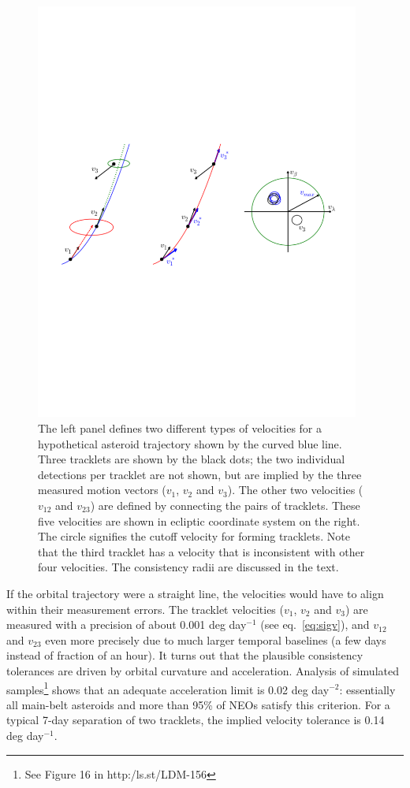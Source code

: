 \begin{figure}[th!]
\centering
\vskip -2.6in
\includegraphics[width=0.95\textwidth]{figures/TrackSlide1}
\vskip -2.7in
\caption{The left panel defines two different types of velocities for a hypothetical asteroid
trajectory shown by the curved blue line. Three tracklets are shown by the black dots; the 
two individual detections per tracklet are not shown, but are implied by the three measured
motion vectors ($v_1$, $v_2$ and $v_3$). The other two velocities ($v_{12}$ and $v_{23}$)
are defined by connecting the pairs of tracklets.  These five velocities are shown in 
ecliptic coordinate system on the right. The circle signifies the cutoff velocity for forming
tracklets. Note that the third tracklet has a velocity that is inconsistent with other four
velocities. The consistency radii are discussed in the text.
\label{fig:TrackSlide1}}
\end{figure}



If the orbital trajectory were a straight line, the velocities would have to align within
their measurement errors. The tracklet velocities ($v_1$, $v_2$ and $v_3$) are measured with 
a precision of about 0.001 deg day$^{-1}$ (see eq.~\ref{eq:sigv}), and $v_{12}$ and $v_{23}$ even 
more precisely due to much larger temporal baselines (a few days instead of fraction of an hour). 
It turns out that the plausible consistency tolerances are driven by orbital curvature and 
acceleration. Analysis of simulated samples\footnote{See Figure 16 in http:/ls.st/LDM-156}
shows that an adequate acceleration limit is 0.02 deg day$^{-2}$: essentially all main-belt
asteroids and more than 95\% of NEOs satisfy this criterion. For a typical 7-day separation
of two tracklets, the implied velocity tolerance is 0.14 deg day$^{-1}$. 


